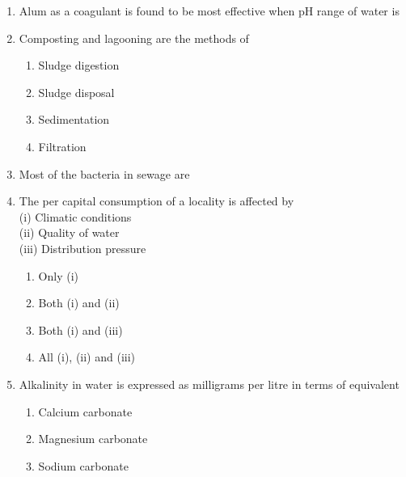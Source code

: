 \documentclass[11pt,a4paper]{article}
\begin{document}
\begin{enumerate}
\begin{enumerate}[label=\Alph*.]
\end{enumerate}
\item{Alum as a coagulant is found to be most effective when pH range of water is}
\\
\item{Composting and lagooning are the methods of}
\begin{enumerate}[label=\Alph*.]
\item{Sludge digestion}
\item{Sludge disposal}
\item{Sedimentation}
\item{Filtration}
\end{enumerate}
\item{Most of the bacteria in sewage are}
\\
\item{The per capital consumption of a locality is affected by \\
 (i) Climatic conditions \\
 (ii) Quality of water \\
 (iii) Distribution pressure}
\begin{enumerate}[label=\Alph*.]
\item{Only (i)}
\item{Both (i) and (ii)}
\item{Both (i) and (iii)}
\item{All (i), (ii) and (iii)}
\end{enumerate}
\item{Alkalinity in water is expressed as milligrams per litre in terms of equivalent}
\begin{enumerate}[label=\Alph*.]
\item{Calcium carbonate}
\item{Magnesium carbonate}
\item{Sodium carbonate}

\end{enumerate}
\end{enumerate}
\end{document}
